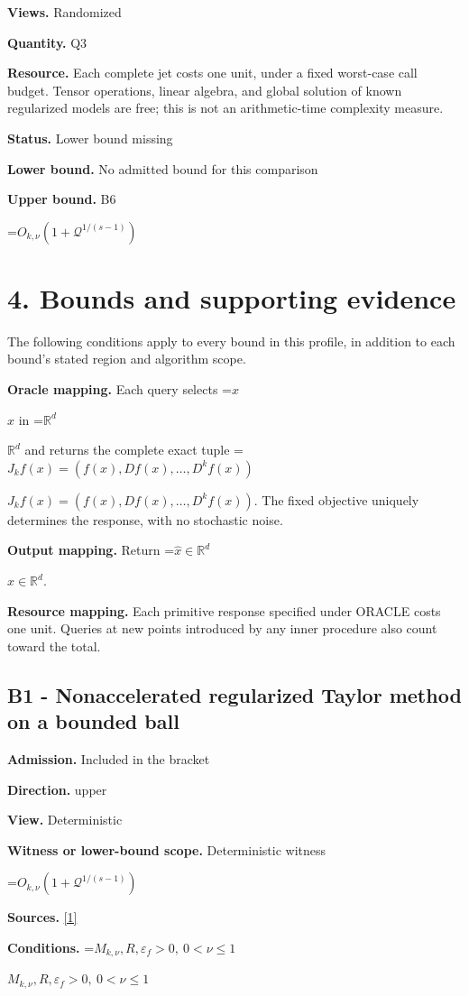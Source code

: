 \documentclass[10pt,a4paper]{article}
\newcommand{\AtlasMath}[1]{\par\begingroup\centering\setbox0=\hbox{$\displaystyle #1$}\ifdim\wd0>1.4\linewidth\typeout{ATLAS WIDE FORMULA: \the\wd0}\fi\ifdim\wd0>\linewidth\resizebox{\linewidth}{!}{\box0}\else\box0\fi\par\endgroup}
\newcommand{\AtlasInlineMath}[1]{\begingroup\setbox0=\hbox{$#1$}\ifdim\wd0>.4\linewidth\endgroup\AtlasMath{#1}\else\endgroup$#1$\fi}
\begin{document}
\textbf{Views.} Randomized

\textbf{Quantity.} Q3

\textbf{Resource.} Each complete jet costs one unit, under a fixed worst-case call budget. Tensor operations, linear algebra, and global solution of known regularized models are free; this is not an arithmetic-time complexity measure.

\textbf{Status.} Lower bound missing

\textbf{Lower bound.} No admitted bound for this comparison

\textbf{Upper bound.} B6

\AtlasMath{O_{k,\nu}(1+\mathcal{Q}^{1/(s-1)})}
\section{4. Bounds and supporting evidence}
The following conditions apply to every bound in this profile, in addition to each bound's stated region and algorithm scope.

\textbf{Oracle mapping.} Each query selects \AtlasInlineMath{x} in \AtlasInlineMath{\mathbb{R}^d} and returns the complete exact tuple \AtlasInlineMath{J_{k}f(x)=(f(x),Df(x),\ldots,D^{k}f(x))}. The fixed objective uniquely determines the response, with no stochastic noise.

\textbf{Output mapping.} Return \AtlasInlineMath{\widehat{x}\in \mathbb{R}^d}.

\textbf{Resource mapping.} Each primitive response specified under ORACLE costs one unit. Queries at new points introduced by any inner procedure also count toward the total.

\subsection{B1 - Nonaccelerated regularized Taylor method on a bounded ball}
\textbf{Admission.} Included in the bracket

\textbf{Direction.} upper

\textbf{View.} Deterministic

\textbf{Witness or lower-bound scope.} Deterministic witness

\AtlasMath{O_{k,\nu}(1+\mathcal{Q}^{1/(s-1)})}
\textbf{Sources.} \href{https://arxiv.org/pdf/2411.08987v2}{[1]}

\textbf{Conditions.} \AtlasInlineMath{M_{k,\nu},R,\varepsilon_f>0,\ 0<\nu\le1}
\end{document}
